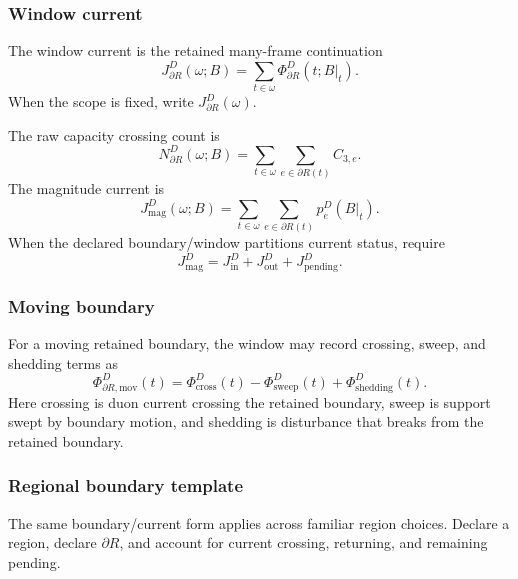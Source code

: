 \subsubsection{Window current}\label{subsec:window-current}
\begin{definition}
The window current is the retained many-frame continuation
\begin{equation}
J^D_{\partial R}(\omega;B)
=
\sum_{t\in\omega}
\Phi^D_{\partial R}(t;B|_t).
\label{eq:window-current}
\end{equation}
When the scope is fixed, write \(J^D_{\partial R}(\omega)\).
\end{definition}
The raw capacity crossing count is
\begin{equation}
N^D_{\partial R}(\omega;B)
=
\sum_{t\in\omega}
\sum_{e\in\partial R(t)}
C_{3,e}.
\label{eq:raw-capacity-crossing-count}
\end{equation}
The magnitude current is
\begin{equation}
J^D_{\mathrm{mag}}(\omega;B)
=
\sum_{t\in\omega}
\sum_{e\in\partial R(t)}
p^D_e(B|_t).
\label{eq:magnitude-current}
\end{equation}
When the declared boundary/window partitions current status, require
\begin{equation}
J^D_{\mathrm{mag}}
=
J^D_{\mathrm{in}}+J^D_{\mathrm{out}}+J^D_{\mathrm{pending}}.
\label{eq:current-magnitude-split}
\end{equation}

\subsubsection{Moving boundary}\label{subsec:moving-boundary}
For a moving retained boundary, the window may record crossing, sweep, and shedding terms as
\begin{equation}
\Phi^D_{\partial R,\mathrm{mov}}(t)
=
\Phi^D_{\mathrm{cross}}(t)
-
\Phi^D_{\mathrm{sweep}}(t)
+
\Phi^D_{\mathrm{shedding}}(t).
\label{eq:moving-boundary}
\end{equation}
Here crossing is duon current crossing the retained boundary, sweep is support swept by boundary motion, and shedding is disturbance that breaks from the retained boundary.

\subsubsection{Regional boundary template}\label{subsec:regional-boundary-template}
The same boundary/current form applies across familiar region choices. Declare a region, declare \(\partial R\), and account for current crossing, returning, and remaining pending.

